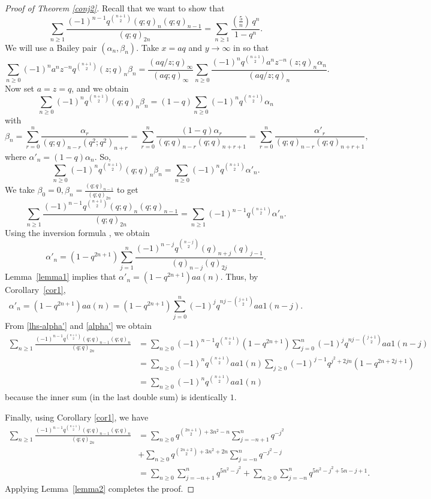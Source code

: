 \documentclass[a4paper,reqno,12pt]{amsart}
\begin{document}
\begin{proof}[Proof of Theorem \ref{conj2}] Recall that we want to show that $$\sum_{n\geq1} \frac{(-1)^{n-1}  q^{\binom{n+1}2} (q;q)_n(q;q)_{n-1}}{(q;q)_{2n}} = \sum_{n\geq1} \frac{(\frac{5}n)\, q^n}{1-q^n}.$$
We will use a Bailey pair $(\alpha_n, \beta_n)$. Take $x=aq$ and $y\rightarrow\infty$ in \cite[eq'n (1.3)]{Slater} so that
$$\sum_{n\geq0} (-1)^na^nz^{-n}q^{\binom{n+1}2} (z;q)_n\beta_n
=\frac{(aq/z;q)_{\infty}}{(aq;q)_{\infty}}
\sum_{n\geq0} 
\frac{(-1)^nq^{\binom{n+1}2}a^nz^{-n}(z;q)_n\alpha_n}{(aq/z;q)_n}.$$
Now set $a=z=q$, and we obtain
$$\sum_{n\geq0} (-1)^n q^{\binom{n+1}2}(q;q)_n\beta_n
=(1-q)\sum_{n\geq0}(-1)^n q^{\binom{n+1}2}\alpha_n$$ 
with 
$$\beta_n=\sum_{r=0}^n \frac{\alpha_r}{(q;q)_{n-r}(q^2;q^2)_{n+r}}=
\sum_{r=0}^n \frac{(1-q)\alpha_r}{(q;q)_{n-r}(q;q)_{n+r+1}}= \sum_{r=0}^n \frac{\alpha'_r}{(q;q)_{n-r}(q;q)_{n+r+1}},$$
where $\alpha'_n=(1-q)\alpha_n$.  So,
$$\sum_{n\geq0} (-1)^n q^{\binom{n+1}2} (q;q)_n\beta_n
=\sum_{n\geq0} (-1)^n q^{\binom{n+1}2}\alpha'_n.$$
We take $\beta_0=0, \beta_n=\frac{(q;q)_{n-1}}{(q;q)_{2n}}$ to get
\begin{equation}\label{lhs-alpha'} \sum_{n\geq1} \frac{(-1)^{n-1} q^{\binom{n+1}2} (q;q)_n(q;q)_{n-1}}{(q;q)_{2n}}
=\sum_{n\geq1} (-1)^{n-1} q^{\binom{n+1}2} \alpha'_n.\end{equation}
Using the  inversion formula \cite[eq'n (4.1)]{Andrews4},  we obtain
$$\alpha'_n=(1-q^{2n+1})\sum_{j=1}^n\frac{(-1)^{n-j}q^{\binom{n-j}2}(q)_{n+j}(q)_{j-1}}{(q)_{n-j}(q)_{2j}}.$$
Lemma~\ref{lemma1} implies that  $\alpha'_n=(1-q^{2n+1}) aa(n)$. Thus, by Corollary~\ref{cor1},
\begin{equation}\label{alpha'}\alpha'_n=(1-q^{2n+1})aa(n)=(1-q^{2n+1}) \sum_{j=0}^n (-1)^j q^{nj-\binom{j+1}2} aa1(n-j).\end{equation}
From \eqref{lhs-alpha'} and \eqref{alpha'} we obtain 
\begin{align*} \sum_{n\geq1} \frac{(-1)^{n-1}q^{\binom{n+1}2} (q;q)_{n-1}(q;q)_n}{(q;q)_{2n}}
&=\sum_{n\geq0} (-1)^{n-1} q^{\binom{n+1}2}(1-q^{2n+1}) \sum_{j=0}^n (-1)^j q^{nj-\binom{j+1}2} aa1(n-j) \\
&=\sum_{n\geq0} (-1)^n q^{\binom{n+1}2} aa1(n) \sum_{j\geq0} (-1)^{j-1}q^{j^2+2jn}(1-q^{2n+2j+1}) \\
&= \sum_{n\geq0} (-1)^n q^{\binom{n+1}2} aa1(n)
\end{align*}
because the inner sum (in the last double sum) is identically $1$.

\smallskip
\noindent
Finally, using Corollary \ref{cor1}, we have
\begin{align*} \sum_{n\geq1} \frac{(-1)^{n-1} q^{\binom{n+1}2} (q;q)_{n-1}(q;q)_n}{(q;q)_{2n}} 
&=\sum_{n\geq0} q^{\binom{2n+1}2+3n^2-n}\sum_{j=-n+1}^nq^{-j^2}  \\
& + \sum_{n\geq0} q^{\binom{2n+2}2+3n^2+2n} \sum_{j=-n}^n q^{-j^2-j} \\
&=\sum_{n\geq0}\sum_{j=-n+1}^n   q^{5n^2-j^2} + \sum_{n\geq0}  \sum_{j=-n}^n q^{5n^2-j^2+5n-j+1}.
\end{align*}
 Applying Lemma~\ref{lemma2} completes the proof.
\end{proof}
\end{document}
